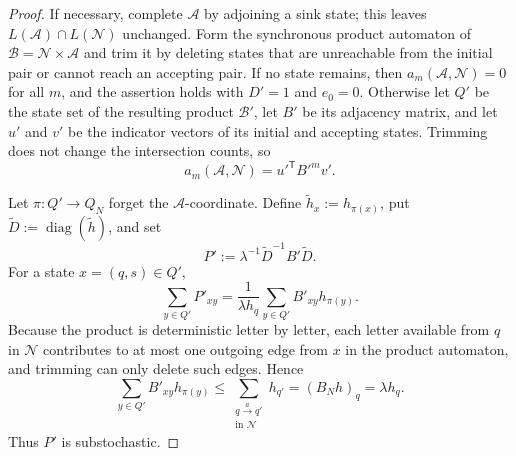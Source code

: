 \begin{proof}
  If necessary, complete \(\mathcal A\) by adjoining a sink state; this
  leaves \(L(\mathcal A)\cap L(\mathcal N)\) unchanged. Form the
  synchronous product automaton of
  \(\mathcal B=\mathcal N\times\mathcal A\) and trim it by deleting
  states that are unreachable from the initial pair or cannot reach an
  accepting pair. If no state remains, then
  \(a_m(\mathcal A,\mathcal N)=0\) for all \(m\), and the assertion
  holds with \(D'=1\) and \(e_0=0\). Otherwise let \(Q'\) be the state
  set of the resulting product \(\mathcal B'\), let \(B'\) be its
  adjacency matrix, and let \(u'\) and \(v'\) be the indicator vectors
  of its initial and accepting states. Trimming does not change the
  intersection counts, so
  \[
    a_m(\mathcal A,\mathcal N)=u'^{\mathsf T}B'^m v'.
  \]

  Let \(\pi\colon Q'\to Q_N\) forget the \(\mathcal A\)-coordinate.
  Define \(\widetilde h_x:=h_{\pi(x)}\), put
  \(\widetilde D:=\operatorname{diag}(\widetilde h)\), and set
  \[
    P':=\lambda^{-1}\widetilde D^{-1}B'\widetilde D.
  \]
  For a state \(x=(q,s)\in Q'\),
  \[
    \sum_{y\in Q'}P'_{xy}
    =\frac{1}{\lambda h_q}\sum_{y\in Q'}B'_{xy}h_{\pi(y)}.
  \]
  Because the product is deterministic letter by letter, each letter
  available from \(q\) in \(\mathcal N\) contributes to at most one
  outgoing edge from \(x\) in the product automaton, and trimming can
  only delete such edges. Hence
  \[
    \sum_{y\in Q'}B'_{xy}h_{\pi(y)}
    \le \sum_{\substack{q\xrightarrow{a}q'\\ \text{in }\mathcal N}} h_{q'}
    =(B_Nh)_q
    =\lambda h_q.
  \]
  Thus \(P'\) is substochastic.


\end{proof}
